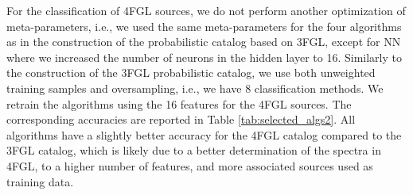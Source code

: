 For the classification of 4FGL sources, we do not perform another optimization of meta-parameters, i.e., we used the same meta-parameters for the four algorithms as in the construction of the probabilistic catalog based on 3FGL, except for NN where we increased the number of neurons in the hidden layer to 16. Similarly to the construction of the 3FGL probabilistic catalog, we use both unweighted training samples and oversampling, i.e., we have 8 classification methods.
We retrain the algorithms using the 16 features for the 4FGL sources.
The corresponding accuracies are reported in Table \ref{tab:selected_algs2}.
All algorithms have a slightly better accuracy for the 4FGL catalog compared to the 3FGL catalog, which is likely due to a better determination of the spectra in 4FGL, to a higher number of features, and more associated sources used as training data. 


\begin{table}[!h]
    \vspace{0.2cm}
    \caption{Testing accuracy of the 4 algorithms on 4FGL associated data. ``\_O'' denotes training with oversampling.}
    \label{tab:selected_algs2}
\end{table}


